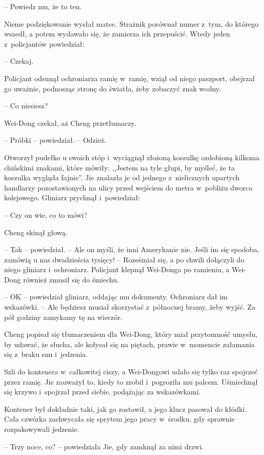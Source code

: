 \documentclass[oneside,polish,11pt,rmheadings]{mwbk}
\begin{document}
-- Powiedz mu, że to ten. 

Nieme podziękowanie wysłał matce. Strażnik porównał numer z~tym, do którego wszedł, a potem wydawało się, że zamierza ich przepuścić. Wtedy jeden z~policjantów powiedział: 

-- Czekaj.

Policjant odsunął ochroniarza ramię w~ramię, wziął od niego paszport, obejrzał go uważnie, podnosząc stronę do światła, żeby zobaczyć znak wodny. 

-- Co niesiesz? 

Wei-Dong czekał, aż Cheng przetłumaczy.

-- Próbki -- powiedział. -- Odzież. 

Otworzył pudełko u swoich stóp i~wyciągnął złożoną koszulkę ozdobioną kilkoma chińskimi znakami, które mówiły: ,,Jestem na tyle głupi, by myśleć, że ta koszulka wygląda fajnie''. Jie znalazła je od jednego z~nielicznych upartych handlarzy pozostawionych na ulicy przed wejściem do metra w~pobliżu dworca kolejowego. Gliniarz prychnął i~powiedział: 

-- Czy on wie, co to mówi?

Cheng skinął głową. 

-- Tak -- powiedział. -- Ale on myśli, że inni Amerykanie nie. Jeśli im się spodoba, zamówią u nas dwadzieścia tysięcy! -- Roześmiał się, a po chwili dołączyli do niego gliniarz i~ochroniarz. Policjant klepnął Wei-Donga po ramieniu, a Wei-Dong również zmusił się do śmiechu.

-- OK -- powiedział gliniarz, oddając mu dokumenty. Ochroniarz dał im wskazówki. -- Ale będziesz musiał skorzystać z~północnej bramy, żeby wyjść. Za pół godziny zamykamy tę na wieczór.

Cheng popisał się tłumaczeniem dla Wei-Dong, który miał przytomność umysłu, by udawać, że słucha, ale kołysał się na piętach, prawie w~momencie załamania się z~braku snu i~jedzenia.

Szli do kontenera w~całkowitej ciszy, a Wei-Dongowi udało się tylko raz spojrzeć przez ramię. Jie zauważył to, kiedy to zrobił i~pogroziła mu palcem. Uśmiechnął się krzywo i~spojrzał przed siebie, podążając za wskazówkami.

Kontener był dokładnie taki, jak go zostawił, a jego klucz pasował do kłódki. Cała czwórka zachwycała się sprytem jego pracy w~środku, gdy sprawnie rozpakowywali jedzenie.

-- Trzy noce, co? -- powiedziała Jie, gdy zamknął za nimi drzwi.
\end{document}
